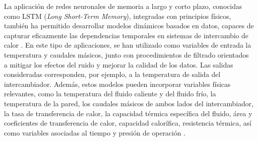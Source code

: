 \documentclass[11pt]{report}
\begin{document}



La aplicación de redes neuronales de memoria a largo y corto plazo, conocidas como LSTM (\textit{Long Short-Term Memory}), integradas con principios físicos, también ha permitido desarrollar modelos dinámicos basados en datos, capaces de capturar eficazmente las dependencias temporales en sistemas de intercambio de calor \cite{TANG2025127322}.  En este tipo de aplicaciones, se han utilizado como variables de entrada la temperatura y caudales másicos, junto con procedimientos de filtrado orientados a mitigar los efectos del ruido y mejorar la calidad de los datos. Las salidas consideradas corresponden, por ejemplo, a la temperatura de salida del intercambiador. Además, estos modelos pueden incorporar variables físicas relevantes, como la temperatura del fluido caliente y del fluido frío, la temperatura de la pared, los caudales másicos de ambos lados del intercambiador, la tasa de transferencia de calor, la capacidad térmica específica del fluido, área y coeficientes de transferencia de calor, capacidad calorífica, resistencia térmica, así como variables asociadas al tiempo y presión de operación \cite{TANG2025127322}.
\end{document}
